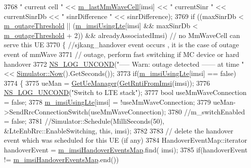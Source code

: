 \begin{DoxyCode}
3768           \textcolor{stringliteral}{" current cell "} << \hyperlink{classns3_1_1LteEnbRrc_a0d7b04f0383b0dc3f6a7360b87cbaeee}{m\_lastMmWaveCell}[imsi] << \textcolor{stringliteral}{" currentSinr "} << currentSinrDb <<
       \textcolor{stringliteral}{" sinrDifference "} << sinrDifference);
3769       \textcolor{keywordflow}{if} ((maxSinrDb < \hyperlink{classns3_1_1LteEnbRrc_adf505b71799b8dbd81372695f14a0716}{m\_outageThreshold} || (\hyperlink{classns3_1_1LteEnbRrc_a99427e888b10d095491e72bf062511db}{m\_imsiUsingLte}[imsi] && 
      maxSinrDb < \hyperlink{classns3_1_1LteEnbRrc_adf505b71799b8dbd81372695f14a0716}{m\_outageThreshold} + 2)) && alreadyAssociatedImsi) \textcolor{comment}{// no MmWaveCell can serve this UE}
3770       \{ \textcolor{comment}{//sjkang\_handover event occurs , it is the case of outage event of mmWave}
3771         \textcolor{comment}{// outage, perform fast switching if MC device or hard handover}
3772         \hyperlink{log-macros-disabled_8h_a0b36e5e182b37194f85ef1c5e979fb2e}{NS\_LOG\_UNCOND}(\textcolor{stringliteral}{"----- Warn: outage detected ------ at time "} << 
      \hyperlink{classns3_1_1Simulator_ac3178fa975b419f7875e7105be122800}{Simulator::Now}().GetSeconds());
3773         \textcolor{keywordflow}{if}(\hyperlink{classns3_1_1LteEnbRrc_a99427e888b10d095491e72bf062511db}{m\_imsiUsingLte}[imsi] == \textcolor{keyword}{false}) 
3774         \{
3775           ueMan = \hyperlink{classns3_1_1LteEnbRrc_a875653948b565dc50b33f6a0434e32d9}{GetUeManager}(\hyperlink{classns3_1_1LteEnbRrc_a98f4b8f727e844ab621e447b7178ddc2}{GetRntiFromImsi}(imsi));
3776           \hyperlink{log-macros-disabled_8h_a0b36e5e182b37194f85ef1c5e979fb2e}{NS\_LOG\_UNCOND}(\textcolor{stringliteral}{"Switch to LTE stack"});
3777           \textcolor{keywordtype}{bool} useMmWaveConnection = \textcolor{keyword}{false}; 
3778           \hyperlink{classns3_1_1LteEnbRrc_a99427e888b10d095491e72bf062511db}{m\_imsiUsingLte}[imsi] = !useMmWaveConnection;
3779           ueMan->SendRrcConnectionSwitch(useMmWaveConnection);
3780           \textcolor{comment}{//m\_switchEnabled = false;}
3781           \textcolor{comment}{//Simulator::Schedule(MilliSeconds(50), &LteEnbRrc::EnableSwitching, this, imsi);}
3782 
3783           \textcolor{comment}{// delete the handover event which was scheduled for this UE (if any)}
3784           HandoverEventMap::iterator handoverEvent = \hyperlink{classns3_1_1LteEnbRrc_a6f703158e9a4ceaccbd1c5df7f5b0ba1}{m\_imsiHandoverEventsMap}.find(
      imsi); 
3785           \textcolor{keywordflow}{if}(handoverEvent != \hyperlink{classns3_1_1LteEnbRrc_a6f703158e9a4ceaccbd1c5df7f5b0ba1}{m\_imsiHandoverEventsMap}.end())

\end{DoxyCode}
